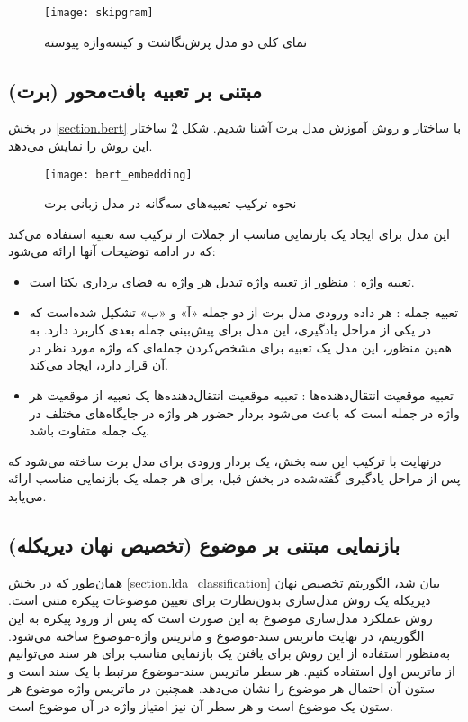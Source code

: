 \begin{figure}[h!]
	\texttt{[image: skipgram]}
	\centering
	\caption{نمای کلی دو مدل پرش‌نگاشت و کیسه‌واژه پیوسته \citep{suleiman2017deep}}
	\label{fig.skipgram}
\end{figure}

\subsection{مبتنی ‌بر تعبیه بافت‌محور (برت)}
در بخش \ref{section.bert} با ساختار و روش آموزش مدل برت آشنا شدیم. شکل  \figurename \ref{fig.bert_embedding} 
ساختار این روش را نمایش می‌دهد.



\begin{figure}[!h]
	\texttt{[image: bert\_embedding]}
	\centering
	\caption{نحوه ترکیب تعبیه‌های سه‌گانه در مدل زبانی برت \citep{devlin2018bert}}
	\label{fig.bert_embedding}
\end{figure}



این مدل برای ایجاد یک بازنمایی مناسب از جملات از ترکیب سه تعبیه استفاده می‌کند که در ادامه توضیحات آنها ارائه می‌شود:
\begin{itemize}
	\item{تعبیه واژه }: منظور از تعبیه واژه تبدیل هر واژه به فضای برداری یکتا است.
	
	\item{تعبیه جمله }: هر داده ورودی مدل برت از دو جمله «آ» و «ب» تشکیل شده‌است که در یکی از مراحل یادگیری، این مدل برای پیش‌بینی جمله بعدی کاربرد دارد. به همین منظور، این مدل یک تعبیه برای مشخص‌کردن جمله‌ای که واژه مورد نظر در آن قرار دارد، ایجاد می‌کند.
	\item{تعبیه موقعیت انتقال‌دهنده‌ها }: تعبیه موقعیت انتقال‌دهنده‌ها یک تعبیه از موقعیت هر واژه در جمله است که باعث می‌شود بردار حضور هر واژه در جایگاه‌های مختلف در یک جمله متفاوت باشد.
\end{itemize}

درنهایت با ترکیب این سه بخش، یک بردار ورودی برای مدل برت ساخته می‌شود که پس از مراحل یادگیری گفته‌شده در بخش قبل، برای هر جمله یک بازنمایی مناسب ارائه می‌یابد.


\subsection{بازنمایی مبتنی ‌بر موضوع (تخصیص نهان دیریکله)}
همان‌طور که در بخش \ref{section.lda_classification} بیان شد، الگوریتم تخصیص نهان دیریکله یک روش مدل‌سازی بدون‌نظارت برای تعیین موضوعات پیکره متنی است. روش عملکرد مدل‌سازی موضوع به این صورت است که پس از ورود پیکره به این الگوریتم، در نهایت ماتریس سند-موضوع و ماتریس واژه-موضوع ساخته می‌شود. به‌منظور استفاده از این روش برای یافتن یک بازنمایی مناسب برای هر سند می‌توانیم از ماتریس اول استفاده کنیم. هر سطر ماتریس سند-موضوع مرتبط با یک سند است و ستون آن احتمال هر موضوع را نشان می‌دهد. همچنین در ماتریس واژه-موضوع هر ستون یک موضوع است و هر سطر آن نیز امتیاز واژه در آن موضوع است.
